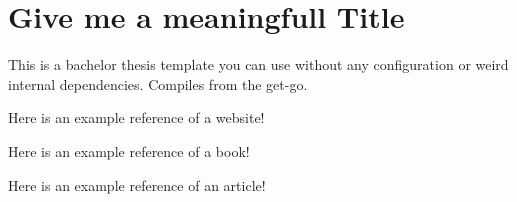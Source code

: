 \chapter{Give me a meaningfull Title}
This is a bachelor thesis template you can use without any configuration or weird internal dependencies. Compiles from the get-go.

Here is an example reference of a website! \citep{google}

Here is an example reference of a book! \citep{goetz2006java}

Here is an example reference of an article! \cite{cattell2011scalable}